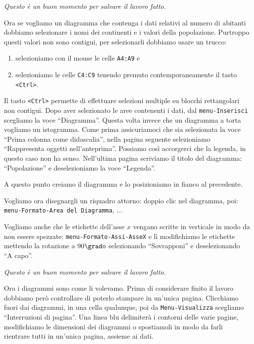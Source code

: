 \emph{Questo è un buon momento per salvare il lavoro fatto.}

Ora se vogliamo un diagramma che contenga i dati relativi al numero di
abitanti dobbiamo selezionare i nomi dei continenti e i valori della
popolazione.
Purtroppo questi valori non sono contigui, per selezionarli
dobbiamo usare un trucco:

\begin{enumerate} [nosep]
\item selezioniamo con il mouse le celle \texttt{A4:A9} e
\item selezioniamo le celle \texttt{C4:C9} tenendo premuto contemporaneamente
il tasto \texttt{\textless{}Ctrl\textgreater{}}.
\end{enumerate}

Il tasto \texttt{\textless{}Ctrl\textgreater{}} permette di effettuare selezioni 
multiple su blocchi
rettangolari non contigui.
Dopo aver selezionato le aree contenenti i dati,
dal \texttt{menu-Inserisci} scegliamo la voce ``Diagramma''.
Questa volta invece che un diagramma a torta vogliamo un istogramma.
Come prima assicuriamoci che sia selezionata la voce
``Prima colonna come didascalia'', nella pagina seguente selezioniamo
``Rappresenta oggetti nell'anteprima''.
Possiamo così accorgerci che la legenda, in questo caso non ha senso.
Nell'ultima pagina scriviamo il titolo del diagramma: ``Popolazione'' e
deselezioniamo la voce ``Legenda''.

A questo punto creiamo il diagramma e lo posizioniamo in fianco al
precedente.

Vogliamo ora disegnargli un riquadro attorno: doppio clic nel diagramma,
poi: \\
\texttt{menu-Formato-Area del Diagramma}, ...

Vogliamo anche che le etichette dell'asse $x$ vengano scritte in
verticale in modo da non essere spezzate: \texttt{menu-Formato-Assi-AsseX} e
lì modifichiamo le etichette mettendo la rotazione a $90\grado$
selezionando ``Sovrapponi'' e deselezionando ``A capo''.

\emph{Questo è un buon momento per salvare il lavoro fatto.}

Ora i diagrammi sono come li volevamo.
Prima di considerare finito il lavoro dobbiamo però controllare di poterlo
stampare in un'unica pagina.
Clicchiamo fuori dai diagrammi, in una cella qualunque,
poi da \texttt{Menu-Visualizza} scegliamo ``Interruzioni di pagina''.
Una linea blu delimiterà i contorni delle varie pagine, modifichiamo le
dimensioni dei diagrammi o spostiamoli in modo da farli rientrare tutti
in un'unica pagina, assieme ai dati.

